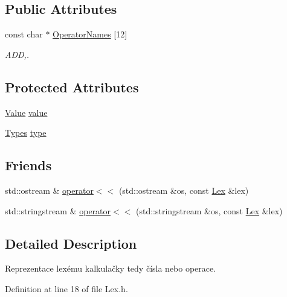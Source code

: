 \subsection*{Public Attributes}
\begin{DoxyCompactItemize}
\item 
const char $\ast$ \hyperlink{classteam22_1_1_calc_1_1_lex_a9d280854466641dfb02159cc4afeec1f}{Operator\+Names} \mbox{[}12\mbox{]}
\begin{DoxyCompactList}\small\item\em A\+DD,. \end{DoxyCompactList}\end{DoxyCompactItemize}
\subsection*{Protected Attributes}
\begin{DoxyCompactItemize}
\item 
\hyperlink{unionteam22_1_1_calc_1_1_lex_1_1_value}{Value} \hyperlink{classteam22_1_1_calc_1_1_lex_a8a78a736b719931cada0905ac13fedc8}{value}
\item 
\hyperlink{classteam22_1_1_calc_1_1_lex_a295984577c98a23ddd20ee36d33145a2}{Types} \hyperlink{classteam22_1_1_calc_1_1_lex_a733fda9ebfa5ed6f588457d0870e81bc}{type}
\end{DoxyCompactItemize}
\subsection*{Friends}
\begin{DoxyCompactItemize}
\item 
std\+::ostream \& \hyperlink{classteam22_1_1_calc_1_1_lex_aca03505bafd6049109d56fd123d2dae6}{operator$<$$<$} (std\+::ostream \&os, const \hyperlink{classteam22_1_1_calc_1_1_lex}{Lex} \&lex)
\item 
std\+::stringstream \& \hyperlink{classteam22_1_1_calc_1_1_lex_a75f9b47ca9b4289a569608f62336b3dd}{operator$<$$<$} (std\+::stringstream \&os, const \hyperlink{classteam22_1_1_calc_1_1_lex}{Lex} \&lex)
\end{DoxyCompactItemize}


\subsection{Detailed Description}
Reprezentace lexému kalkulačky tedy čísla nebo operace. 

Definition at line 18 of file Lex.\+h.



